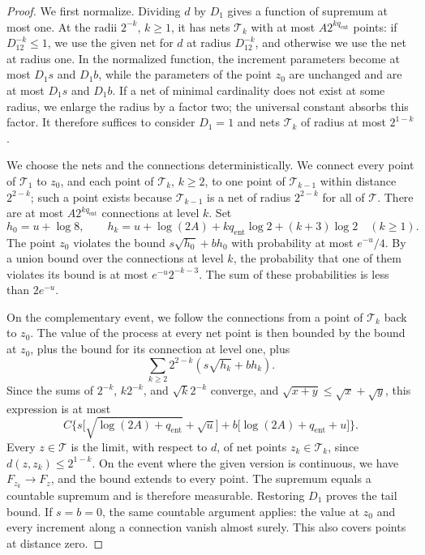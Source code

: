 \begin{proof}
We first normalize. Dividing $d$ by $D_1$ gives a function of supremum at most one. At the radii $2^{-k}$, $k\ge1$, it has nets $\mathcal T_k$ with at most $A2^{kq_{\mathrm{ent}}}$ points: if $D_12^{-k}\le1$, we use the given net for $d$ at radius $D_12^{-k}$, and otherwise we use the net at radius one. In the normalized function, the increment parameters become at most $D_1s$ and $D_1b$, while the parameters of the point $z_0$ are unchanged and are at most $D_1s$ and $D_1b$. If a net of minimal cardinality does not exist at some radius, we enlarge the radius by a factor two; the universal constant absorbs this factor. It therefore suffices to consider $D_1=1$ and nets $\mathcal T_k$ of radius at most $2^{1-k}$.

We choose the nets and the connections deterministically. We connect every point of $\mathcal T_1$ to $z_0$, and each point of $\mathcal T_k$, $k\ge2$, to one point of $\mathcal T_{k-1}$ within distance $2^{2-k}$; such a point exists because $\mathcal T_{k-1}$ is a net of radius $2^{2-k}$ for all of $\mathcal T$. There are at most $A2^{kq_{\mathrm{ent}}}$ connections at level $k$. Set
\[
 h_0=u+\log8,\qquad h_k=u+\log(2A)+kq_{\mathrm{ent}}\log2+(k+3)\log2\quad(k\ge1).
\]
The point $z_0$ violates the bound $s\sqrt{h_0}+bh_0$ with probability at most $e^{-u}/4$. By a union bound over the connections at level $k$, the probability that one of them violates its bound is at most $e^{-u}2^{-k-3}$. The sum of these probabilities is less than $2e^{-u}$. 

On the complementary event, we follow the connections from a point of $\mathcal T_k$ back to $z_0$. The value of the process at every net point is then bounded by the bound at $z_0$, plus the bound for its connection at level one, plus
\[
 \sum_{k\ge2}2^{2-k}(s\sqrt{h_k}+bh_k).
\]
Since the sums of $2^{-k}$, $k2^{-k}$, and $\sqrt k2^{-k}$ converge, and $\sqrt{x+y}\le\sqrt x+\sqrt y$, this expression is at most
\[
 C\bigl\{s\bigl[\sqrt{\log(2A)+q_{\mathrm{ent}}}+\sqrt u\bigr]+b\bigl[\log(2A)+q_{\mathrm{ent}}+u\bigr]\bigr\}.
\]
Every $z\in\mathcal T$ is the limit, with respect to $d$, of net points $z_k\in\mathcal T_k$, since $d(z,z_k)\le2^{1-k}$. On the event where the given version is continuous, we have $F_{z_k}\to F_z$, and the bound extends to every point. The supremum equals a countable supremum and is therefore measurable. Restoring $D_1$ proves the tail bound. If $s=b=0$, the same countable argument applies: the value at $z_0$ and every increment along a connection vanish almost surely. This also covers points at distance zero.


\end{proof}
